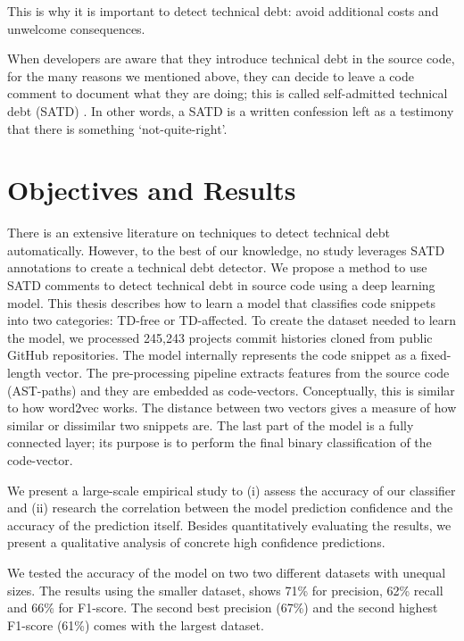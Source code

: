 This is why it is important to detect technical debt: avoid additional costs and unwelcome consequences. 

When developers are aware that they introduce technical debt in the source code, for the many reasons we mentioned above, they can decide to leave a code comment to document what they are doing; this is called self-admitted technical debt (SATD) \cite{potdar2014exploratory}. In other words, a SATD is a written confession left as a testimony that there is something `not-quite-right'.


\section{Objectives and Results}
There is an extensive literature on techniques to detect technical debt automatically. However, to the best of our knowledge, no study leverages SATD annotations to create a technical debt detector.
We propose a method to use SATD comments to detect technical debt in source code using a deep learning model. 
This thesis describes how to learn a model that classifies code snippets into two categories: TD-free or TD-affected.
To create the dataset needed to learn the model, we processed 245,243 projects commit histories cloned from public GitHub repositories. 
The model internally represents the code snippet as a fixed-length vector. The pre-processing pipeline extracts features from the source code (AST-paths) and they are embedded as code-vectors. Conceptually, this is similar to how word2vec works. The distance between two vectors gives a measure of how similar or dissimilar two snippets are. The last part of the model is a fully connected layer; its purpose is to perform the final binary classification of the code-vector. 

We present a large-scale empirical study to (i) assess the accuracy of our classifier and (ii) research the correlation between the model prediction confidence and the accuracy of the prediction itself. Besides quantitatively evaluating the results, we present a qualitative analysis of concrete high confidence predictions.

We tested the accuracy of the model on two two different datasets with unequal sizes. The results using the smaller dataset, shows 71\% for precision, 62\% recall and 66\% for F1-score. The second best precision (67\%) and the second highest F1-score (61\%) comes with the largest dataset.

